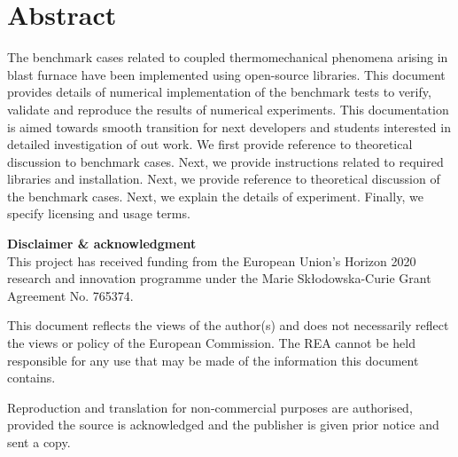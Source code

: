 \documentclass{ROMSOC}
\begin{document}
\section*{Abstract}

The benchmark cases related to coupled thermomechanical phenomena arising in blast furnace have been implemented using open-source libraries. This document provides details of numerical implementation of the benchmark tests to verify, validate and reproduce the results of numerical experiments. This documentation is aimed towards smooth transition for next developers and students interested in detailed investigation of out work. We first provide reference to theoretical discussion to benchmark cases. Next, we provide instructions related to required libraries and installation. Next, we provide reference to theoretical discussion of the benchmark cases. Next, we explain the details of experiment. Finally, we specify licensing and usage terms.

\vfill

{\small
\textbf{Disclaimer \& acknowledgment}\\
This project has received funding from the European Union’s Horizon 2020 research and innovation programme under the Marie Sk\l odowska-Curie Grant Agreement No. 765374. 

This document reflects the views of the author(s) and does not necessarily reflect the views or policy of the European Commission. The REA cannot be held responsible for any use that may be made of the information this document contains.

Reproduction and translation for non-commercial purposes are authorised, provided the source is acknowledged and the publisher is given prior notice and sent a copy. 
}
\clearpage


\setcounter{tocdepth}{2}

\tableofcontents

\newpage
\end{document}
